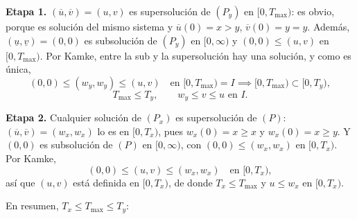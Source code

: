 {    \textbf{Etapa 1.} $(\overline{u}, \overline{v}) = (u, v)$ es supersolución de $(P_y)$ en $[0, T_{\max})$: es obvio, porque es solución del mismo sistema y $\overline{u}(0) = x > y$, $\overline{v}(0) = y = y$. Además, $(\underline{u}, \underline{v}) = (0, 0)$ es subsolución de $(P_y)$ en $[0, \infty)$ y $(0, 0) \leq (u, v)$ en $[0, T_{\max})$. Por Kamke, entre la sub y la supersolución hay una solución, y como es única,
    \[
        (0, 0) \leq (w_y, w_y) \leq (u, v) \quad \text{en } [0, T_{\max}) = I
        \implies [0, T_{\max}) \subset [0, T_y),
    \]
    \[
        \boxed{T_{\max} \leq T_y}, \qquad \boxed{w_y \leq v \leq u \text{ en } I}.
    \]

    \textbf{Etapa 2.} Cualquier solución de $(P_x)$ es supersolución de $(P)$: $(\overline{u}, \overline{v}) = (w_x, w_x)$ lo es en $[0, T_x)$, pues $w_x(0) = x \geq x$ y $w_x(0) = x \geq y$. Y $(0, 0)$ es subsolución de $(P)$ en $[0, \infty)$, con $(0, 0) \leq (w_x, w_x)$ en $[0, T_x)$. Por Kamke,
    \[
        (0, 0) \leq (u, v) \leq (w_x, w_x) \quad \text{en } [0, T_x),
    \]
    así que $(u, v)$ está definida en $[0, T_x)$, de donde $\boxed{T_x \leq T_{\max}}$ y $u \leq w_x$ en $[0, T_x)$.

    En resumen, $T_x \leq T_{\max} \leq T_y$:
    \begin{center}
    \end{center}
}

